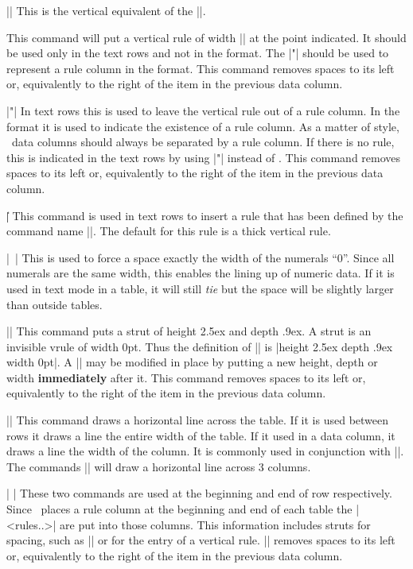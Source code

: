 \mbr
\pri\@||
\nbr
This is the vertical equivalent of the |\halign|. 
\endblockmode

\beginblockmode
\ext\vrt
\nbr
This command will put a vertical rule of width |\tr| at the point indicated.
It should be used only in the text rows and not in the format. The |"| should
be used to represent a rule column in the format. This command removes spaces to its left or, equivalently to the
right of the item in the previous data column.

\mbr
\ext|"|
\nbr
In text rows this is used to leave the vertical rule out of a rule column. In
the format it is used to indicate the existence of a rule column. As a matter
of style, \intex\ data columns should always be separated by a rule column.
If there is no rule, this is indicated in the text rows by using |"| instead
of \vrt.  This command removes spaces to its left or, equivalently to the
right of the item in the previous data column.

\mbr
\ext|\|\vrt
\nbr
This command is used in text rows to insert a rule that has been defined by
the command name |\sprule|. The default for this rule is a thick vertical
rule.

\mbr
\ext\@|~|
\nbr
This is used to force a space exactly the width of the numerals ``0''. 
Since all numerals are the same width, this enables the  lining up of 
numeric data. If it is used in text mode in a table, it will still {\it tie} but
the space will be slightly larger than outside tables.

\mbr
\ext\@|\:|
\nbr
This command puts a strut of height 2.5ex and depth .9ex. A strut is an
invisible vrule of width 0pt. Thus the definition of |\:| is 
|\vrule height 2.5ex depth .9ex width 0pt|. A |\:| may be modified in place
by putting a new height, depth or width {\bf immediately} after it. 
This command removes spaces to its left or, equivalently to the
right of the item in the previous data column.


\mbr
\ext\@|\-|
\nbr
This command draws a horizontal line across the table. If it is used between
rows it draws a line the entire width of the table. If it used in a data
column, it draws a line the width of the column.
It is commonly used in conjunction with |\use|. The commands
|\-| will draw a horizontal line across 3 columns.

\mbr
\ext\@|   |
\nbr
These two commands are used at the beginning and end of row respectively.
Since \intex\ places a rule column at the beginning and end of each table the
|<rules..>| are put into those columns. This information includes struts for
spacing, such as |\:| or \vrt for the entry of a vertical rule. 
|\er| removes spaces to its left or, equivalently to the
right of the item in the previous data column.

